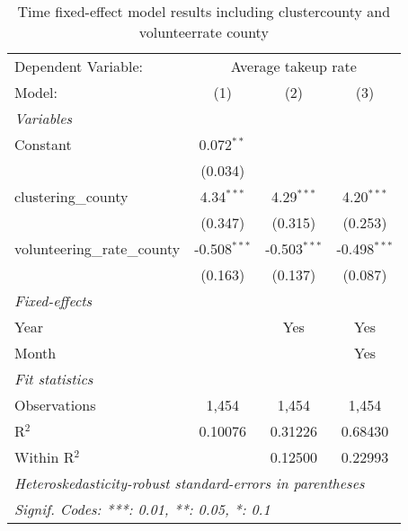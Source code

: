 \documentclass{article}
\begin{document}
\begin{table}[htbp]
   
   \centering
   \begin{tabular}{lccc}
      \tabularnewline \midrule \midrule
      Dependent Variable: & \multicolumn{3}{c}{Average takeup rate}\\
      Model:                       & (1)            & (2)            & (3)\\  
      \midrule
      \emph{Variables}\\
      Constant                     & 0.072$^{**}$   &                &   \\   
                                   & (0.034)        &                &   \\   
      clustering\_county           & 4.34$^{***}$   & 4.29$^{***}$   & 4.20$^{***}$\\   
                                   & (0.347)        & (0.315)        & (0.253)\\   
      volunteering\_rate\_county   & -0.508$^{***}$ & -0.503$^{***}$ & -0.498$^{***}$\\   
                                   & (0.163)        & (0.137)        & (0.087)\\   
      \midrule
      \emph{Fixed-effects}\\
      Year                         &                & Yes            & Yes\\  
      Month                        &                &                & Yes\\  
      \midrule
      \emph{Fit statistics}\\
      Observations                 & 1,454          & 1,454          & 1,454\\  
      R$^2$                        & 0.10076        & 0.31226        & 0.68430\\  
      Within R$^2$                 &                & 0.12500        & 0.22993\\  
      \midrule \midrule
      \multicolumn{4}{l}{\emph{Heteroskedasticity-robust standard-errors in parentheses}}\\
      \multicolumn{4}{l}{\emph{Signif. Codes: ***: 0.01, **: 0.05, *: 0.1}}\\
   \end{tabular}
   \caption{Time fixed-effect model results including cluster\textunderscore county and volunteer\textunderscore rate \textunderscore county}
   \label{result3}
\end{table}
\end{document}
